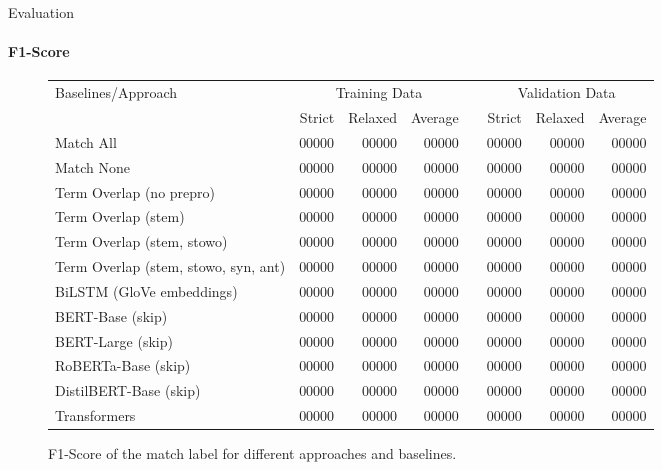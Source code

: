 \documentclass[english,handout]{mlutalk}
\begin{document}
\begin{frame}{Evaluation}
  \framesubtitle{F1-Score}
  \begin{figure}
    \centering
    \caption{F1-Score of the match label for different approaches and baselines.}
    \tiny
    \begin{tabular}{lrrrlrrr}
      \toprule
      Baselines/Approach & \multicolumn{3}{c}{Training Data} & & \multicolumn{3}{c}{Validation Data}\\ \cline{2-4} \cline{6-8}
        & Strict & Relaxed & Average & & Strict & Relaxed & Average\\
      \midrule
      Match All                           & 00000 & 00000 & 00000 & & 00000 & 00000 & 00000\\
      Match None                          & 00000 & 00000 & 00000 & & 00000 & 00000 & 00000\\
      Term Overlap (no prepro)            & 00000 & 00000 & 00000 & & 00000 & 00000 & 00000\\
      Term Overlap (stem)                 & 00000 & 00000 & 00000 & & 00000 & 00000 & 00000\\
      Term Overlap (stem, stowo)          & 00000 & 00000 & 00000 & & 00000 & 00000 & 00000\\
      Term Overlap (stem, stowo, syn, ant)& 00000 & 00000 & 00000 & & 00000 & 00000 & 00000\\
      \midrule
      BiLSTM (GloVe embeddings)           & 00000 & 00000 & 00000 & & 00000 & 00000 & 00000\\
      BERT-Base (skip)                    & 00000 & 00000 & 00000 & & 00000 & 00000 & 00000\\
      BERT-Large (skip)                   & 00000 & 00000 & 00000 & & 00000 & 00000 & 00000\\
      RoBERTa-Base (skip)                 & 00000 & 00000 & 00000 & & 00000 & 00000 & 00000\\
      DistilBERT-Base (skip)              & 00000 & 00000 & 00000 & & 00000 & 00000 & 00000\\
      Transformers                        & 00000 & 00000 & 00000 & & 00000 & 00000 & 00000\\
      \bottomrule
    \end{tabular}
  \end{figure}
\end{frame}
\end{document}
